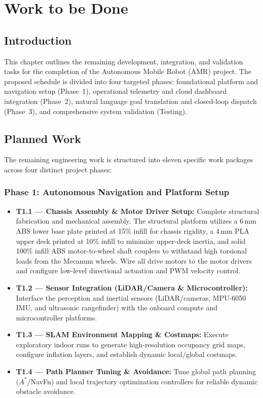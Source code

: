 \chapter{Work to be Done}
\label{ch:work_to_be_done}
\label{Ch_6_Work to be done}

\section{Introduction}
This chapter outlines the remaining development, integration, and validation tasks for the completion of the Autonomous Mobile Robot (AMR) project. The proposed schedule is divided into four targeted phases: foundational platform and navigation setup (Phase~1), operational telemetry and cloud dashboard integration (Phase~2), natural language goal translation and closed-loop dispatch (Phase~3), and comprehensive system validation (Testing).

\section{Planned Work}
The remaining engineering work is structured into eleven specific work packages across four distinct project phases:

\subsection*{Phase 1: Autonomous Navigation and Platform Setup}
\begin{itemize}
    \item \textbf{T1.1 --- Chassis Assembly \& Motor Driver Setup:} Complete structural fabrication and mechanical assembly. The structural platform utilizes a 6\,mm ABS lower base plate printed at 15\% infill for chassis rigidity, a 4\,mm PLA upper deck printed at 10\% infill to minimize upper-deck inertia, and solid 100\% infill ABS motor-to-wheel shaft couplers to withstand high torsional loads from the Mecanum wheels. Wire all drive motors to the motor drivers and configure low-level directional actuation and PWM velocity control.
    \item \textbf{T1.2 --- Sensor Integration (LiDAR/Camera \& Microcontroller):} Interface the perception and inertial sensors (LiDAR/cameras, MPU-6050 IMU, and ultrasonic rangefinder) with the onboard compute and microcontroller platforms.
    \item \textbf{T1.3 --- SLAM Environment Mapping \& Costmaps:} Execute exploratory indoor runs to generate high-resolution occupancy grid maps, configure inflation layers, and establish dynamic local/global costmaps.
    \item \textbf{T1.4 --- Path Planner Tuning \& Avoidance:} Tune global path planning ($A^*$/NavFn) and local trajectory optimization controllers for reliable dynamic obstacle avoidance.
\end{itemize}

